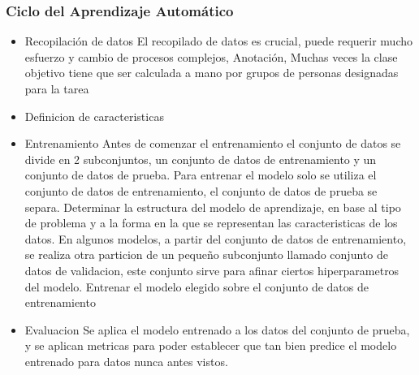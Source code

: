 \documentclass[a4paper,10pt]{article}
\begin{document}
    \subsubsection{Ciclo del Aprendizaje Automático}
      \begin{itemize}
	\item Recopilación de datos
	  El recopilado de datos es crucial, puede requerir mucho esfuerzo y cambio de procesos complejos, 
	  Anotación, Muchas veces la clase objetivo tiene que ser calculada a mano por grupos de personas designadas para la tarea
	\item Definicion de caracteristicas
	\item Entrenamiento
	  Antes de comenzar el entrenamiento el conjunto de datos se divide en 2 subconjuntos, un conjunto de datos de entrenamiento y un conjunto de datos de prueba. 
	  Para entrenar el modelo solo se utiliza el conjunto de datos de entrenamiento, el conjunto de datos de prueba se separa.
	  Determinar la estructura del modelo de aprendizaje, en base al tipo de problema y a la forma en la que se representan las caracteristicas de los datos.
	  En algunos modelos, a partir del conjunto de datos de entrenamiento, se realiza otra particion de un pequeño subconjunto llamado conjunto de datos de validacion, este conjunto sirve 
	  para afinar ciertos hiperparametros del modelo.
	  Entrenar el modelo elegido sobre el conjunto de datos de entrenamiento
	\item Evaluacion
	  Se aplica el modelo entrenado a los datos del conjunto de prueba, y se aplican metricas para poder establecer que tan bien predice el modelo entrenado para datos nunca antes vistos.
    \end{itemize}
\end{document}

